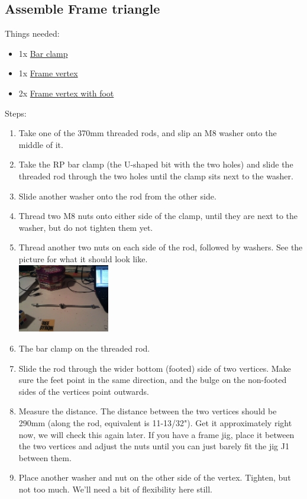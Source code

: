 \documentclass[11pt]{article}
\begin{document}
\subsection{Assemble Frame triangle}
Things needed:
\begin{itemize}
\item 1x \hyperlink{thing_bar-clamp}{Bar clamp}
\item 1x \hyperlink{thing_frame-vertex}{Frame vertex}
\item 2x \hyperlink{thing_frame-vertex-foot}{Frame vertex with foot}
\end{itemize}
Steps:
\begin{enumerate}
\item Take one of the 370mm threaded rods, and slip an M8 washer onto the middle of it.
\item Take the RP bar clamp (the U-shaped bit with the two holes) and slide the threaded rod through the two holes until the clamp sits next to the washer.
\item Slide another washer onto the rod from the other side.
\item Thread two M8 nuts onto either side of the clamp, until they are next to the washer, but do not tighten them yet.
\item Thread another two nuts on each side of the rod, followed by washers. See the picture for what it should look like.\\ \includegraphics[width=4cm]{images/frame/threaded-rod-with-bar-clamp.jpg}
\item The bar clamp on the threaded rod.
\item Slide the rod through the wider bottom (footed) side of two vertices. Make sure the feet point in the same direction, and the bulge on the non-footed sides of the vertices point outwards.
\item Measure the distance. The distance between the two vertices should be 290mm (along the rod, equivalent is 11-13/32"). Get it approximately right now, we will check this again later. If you have a frame jig, place it between the two vertices and adjust the nuts until you can just barely fit the jig J1 between them.
\item Place another washer and nut on the other side of the vertex. Tighten, but not too much. We'll need a bit of flexibility here still.

\end{enumerate}
\end{document}
